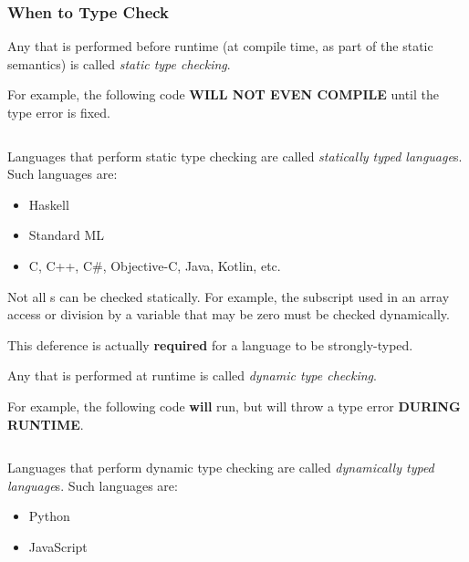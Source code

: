 \subsubsection{When to Type Check}\label{subsubsec:When_Type_Check}
\begin{definition}\label{def:Static_Type_Checking}
  Any  that is performed before runtime (at compile time, as part of the static semantics) is called \emph{static type checking}.

  For example, the following code \textbf{WILL NOT EVEN COMPILE} until the type error is fixed.
  \inputminted[frame=lines,linenos]{scala}{./EDAP05-Concepts_Programming_Languages-Sections/Language_Critique/Code/Static_Type_Check.scala}

  Languages that perform static type checking are called \emph{statically typed language}s.
  Such languages are:
  \begin{itemize}[noitemsep]
  \item Haskell
  \item Standard ML
  \item C, C++, C\#, Objective-C, Java, Kotlin, etc.
  \end{itemize}

  \begin{remark}\label{rmk:Static_Type_Checking-Undecidability}
    Not all s can be checked statically.
    For example, the subscript used in an array access or division by a variable that may be zero must be checked dynamically.

    This deference is actually \textbf{required} for a language to be strongly-typed.
  \end{remark}
\end{definition}

\begin{definition}\label{def:Dynamic_Type_Checking}
  Any  that is performed at runtime is called \emph{dynamic type checking}.

  For example, the following code \textbf{will} run, but will throw a type error \textbf{DURING RUNTIME}.
  \inputminted[frame=lines,linenos]{javascript}{./EDAP05-Concepts_Programming_Languages-Sections/Language_Critique/Code/Dynamic_Type_Check.js}

  Languages that perform dynamic type checking are called \emph{dynamically typed language}s.
  Such languages are:
  \begin{itemize}[noitemsep]
  \item Python
  \item JavaScript
  \end{itemize}
\end{definition}

